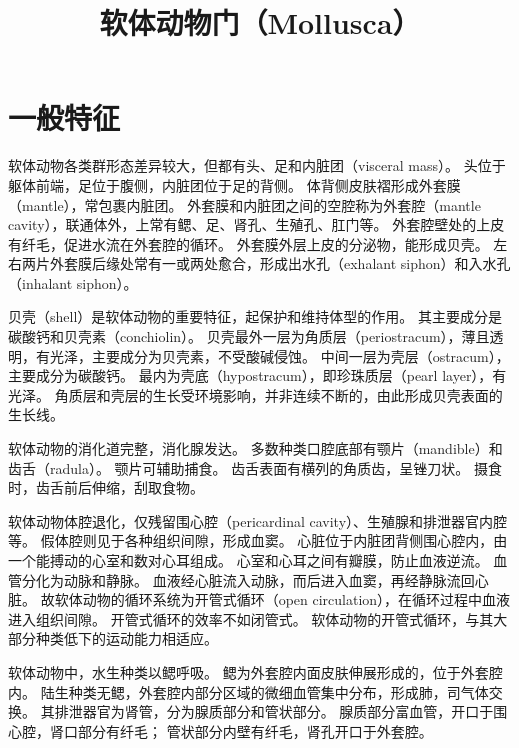 \documentclass[11pt]{article}
\title{软体动物门（Mollusca）}
\date{}
\begin{document}
  \maketitle

  \linenumbers
 
\section{一般特征}
软体动物各类群形态差异较大，但都有头、足和内脏团（visceral mass）。
头位于躯体前端，足位于腹侧，内脏团位于足的背侧。
体背侧皮肤褶形成外套膜（mantle），常包裹内脏团。
外套膜和内脏团之间的空腔称为外套腔（mantle cavity），联通体外，上常有鳃、足、肾孔、生殖孔、肛门等。
外套腔壁处的上皮有纤毛，促进水流在外套腔的循环。
外套膜外层上皮的分泌物，能形成贝壳。
左右两片外套膜后缘处常有一或两处愈合，形成出水孔（exhalant siphon）和入水孔（inhalant siphon）。

\newline

贝壳（shell）是软体动物的重要特征，起保护和维持体型的作用。
其主要成分是碳酸钙和贝壳素（conchiolin）。
贝壳最外一层为角质层（periostracum），薄且透明，有光泽，主要成分为贝壳素，不受酸碱侵蚀。
中间一层为壳层（ostracum），主要成分为碳酸钙。
最内为壳底（hypostracum），即珍珠质层（pearl layer），有光泽。
角质层和壳层的生长受环境影响，并非连续不断的，由此形成贝壳表面的生长线。

\newline

软体动物的消化道完整，消化腺发达。
多数种类口腔底部有颚片（mandible）和齿舌（radula）。
颚片可辅助捕食。
齿舌表面有横列的角质齿，呈锉刀状。
摄食时，齿舌前后伸缩，刮取食物。

\newline

软体动物体腔退化，仅残留围心腔（pericardinal cavity）、生殖腺和排泄器官内腔等。
假体腔则见于各种组织间隙，形成血窦。
心脏位于内脏团背侧围心腔内，由一个能搏动的心室和数对心耳组成。
心室和心耳之间有瓣膜，防止血液逆流。
血管分化为动脉和静脉。
血液经心脏流入动脉，而后进入血窦，再经静脉流回心脏。
故软体动物的循环系统为开管式循环（open circulation），在循环过程中血液进入组织间隙。
开管式循环的效率不如闭管式。
软体动物的开管式循环，与其大部分种类低下的运动能力相适应。

\newline

软体动物中，水生种类以鳃呼吸。
鳃为外套腔内面皮肤伸展形成的，位于外套腔内。
陆生种类无鳃，外套腔内部分区域的微细血管集中分布，形成肺，司气体交换。
其排泄器官为肾管，分为腺质部分和管状部分。
腺质部分富血管，开口于围心腔，肾口部分有纤毛；
管状部分内壁有纤毛，肾孔开口于外套腔。
\end{document}
